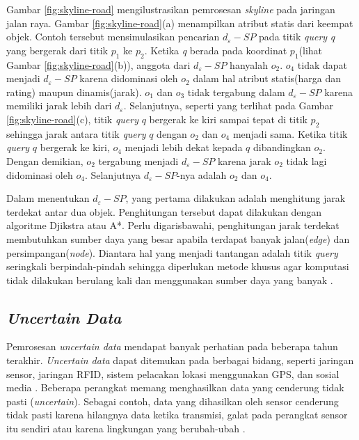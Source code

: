 \documentclass[conference]{IEEEtran}
\begin{document}
Gambar \ref{fig:skyline-road} mengilustrasikan pemrosesan \textit{skyline} pada jaringan jalan raya. Gambar \ref{fig:skyline-road}(a) menampilkan atribut statis dari keempat objek. Contoh tersebut mensimulasikan pencarian $ d_\varepsilon-SP $ pada titik \textit{query} \textit{q} yang bergerak dari titik $ p_1 $ ke $ p_2 $. Ketika \textit{q} berada pada koordinat $ p_1 $(lihat Gambar \ref{fig:skyline-road}(b)), anggota dari $ d_\varepsilon-SP $ hanyalah $ o_2 $. $ o_4 $ tidak dapat menjadi $ d_\varepsilon-SP $ karena didominasi oleh $ o_2 $ dalam hal atribut statis(harga dan rating) maupun dinamis(jarak). $ o_1 $ dan $ o_3 $ tidak tergabung dalam $ d_\varepsilon-SP $ karena memiliki jarak lebih dari $ d_\varepsilon $. Selanjutnya, seperti yang terlihat pada Gambar \ref{fig:skyline-road}(c), titik \textit{query} $ q $ bergerak ke kiri sampai tepat di titik $ p_2 $ sehingga jarak antara titik \textit{query} $ q $ dengan $ o_2 $ dan $ o_4 $ menjadi sama. Ketika titik \textit{query} $ q $ bergerak ke kiri, $ o_4 $ menjadi lebih dekat kepada $ q $ dibandingkan $ o_2 $. Dengan demikian, $ o_2 $ tergabung menjadi $ d_\varepsilon-SP $ karena jarak $ o_2 $ tidak lagi didominasi oleh $ o_4 $. Selanjutnya $ d_\varepsilon-SP $-nya adalah $ o_2 $ dan $ o_4 $.

Dalam menentukan $ d_\varepsilon-SP $, yang pertama dilakukan adalah menghitung jarak terdekat antar dua objek. Penghitungan tersebut dapat dilakukan dengan algoritme Djikstra atau A*. Perlu digarisbawahi, penghitungan jarak terdekat membutuhkan sumber daya yang besar apabila terdapat banyak jalan(\textit{edge}) dan persimpangan(\textit{node}). Diantara hal yang menjadi tantangan adalah titik \textit{query} seringkali berpindah-pindah sehingga diperlukan metode khusus agar komputasi tidak dilakukan berulang kali dan menggunakan sumber daya yang banyak \cite{continuousdbased}.

\subsection{\textit{Uncertain Data}}
Pemrosesan  \textit{uncertain data} mendapat banyak perhatian pada beberapa tahun terakhir. \textit{Uncertain data} dapat ditemukan pada berbagai bidang, seperti jaringan sensor, jaringan RFID, sistem pelacakan lokasi menggunakan GPS, dan sosial media \cite{surveyuncertaindata}. Beberapa perangkat memang menghasilkan data yang cenderung tidak pasti (\textit{uncertain}). Sebagai contoh, data yang dihasilkan oleh sensor cenderung tidak pasti karena hilangnya data ketika transmisi, galat pada perangkat sensor itu sendiri atau karena lingkungan yang berubah-ubah \cite{effectiveprob}.
\end{document}
